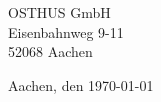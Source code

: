 \documentclass[a4paper,10pt]{article}
\begin{document}
\pagestyle{fancyplain} %
\thispagestyle{empty} %



\pagebreak

\pagestyle{fancyplain} %

\begin{infoEnterprise}
OSTHUS GmbH \\
Eisenbahnweg 9-11 \\
52068 Aachen 
\end{infoEnterprise}

\begin{dateofdocument}
\hfill
Aachen, den \today
\end{dateofdocument}
\vspace{0.05cm}
\\
\end{document}
